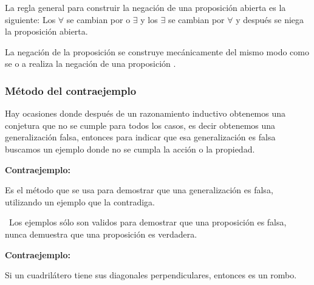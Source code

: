 La regla general para construir la negación de una proposición abierta
es la siguiente: Los $\forall$ se cambian por o $\exists$ y los
$\exists$ se cambian por \foreignlanguage{english}{$\forall$} y
después se niega la proposición abierta. 

La negación de la proposición se construye mecánicamente del mismo
modo como se o a realiza la negación de una proposición . 

\subsubsection{Método del contraejemplo}

Hay ocasiones donde después de un razonamiento inductivo obtenemos
una conjetura que no se cumple para todos los casos, es decir obtenemos
una generalización falsa, entonces para indicar que esa generalización
es falsa buscamos un ejemplo donde no se cumpla la acción o la propiedad. 

\begin{ideabox}{\bf Contraejemplo:}

Es el método que se usa para demostrar que una generalización es falsa,
utilizando un ejemplo que la contradiga. \end{ideabox}

\obs\ Los ejemplos sólo son validos para demostrar que una proposición
es falsa, nunca demuestra que una proposición es verdadera. \begin{ejemplo}{\bf Contraejemplo:}

Si un cuadrilátero tiene sus diagonales perpendiculares, entonces
es un rombo.\end{ejemplo}

